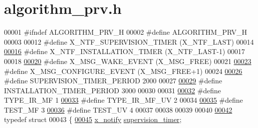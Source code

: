 \hypertarget{a00010_source}{\section{algorithm\+\_\+prv.\+h}
\label{a00010_source}
}

\begin{DoxyCode}
00001 \textcolor{preprocessor}{#ifndef ALGORITHM\_PRV\_H}
00002 \textcolor{preprocessor}{#define ALGORITHM\_PRV\_H}
00003 
00012 \textcolor{preprocessor}{#define X\_NTF\_SUPERVISION\_TIMER                (X\_NTF\_LAST)}
00014 
\hypertarget{a00010_source_l00016}{}\hyperlink{a00010_a3339ece3779a71354bcfaa90905b3a4a}{00016} \textcolor{preprocessor}{#define X\_NTF\_INSTALLATION\_TIMER               (X\_NTF\_LAST-1)}
00017 
00018 
\hypertarget{a00010_source_l00020}{}\hyperlink{a00010_ae6be514b1d949dc71420a3e549772995}{00020} \textcolor{preprocessor}{#define X\_MSG\_WAKE\_EVENT                       (X\_MSG\_FREE)}
00021 
\hypertarget{a00010_source_l00023}{}\hyperlink{a00010_a410c7d83b819fa283303a53830c87a96}{00023} \textcolor{preprocessor}{#define X\_MSG\_CONFIGURE\_EVENT                  (X\_MSG\_FREE+1)}
00024 
\hypertarget{a00010_source_l00026}{}\hyperlink{a00010_abc6f7a40b6aee60b122db32a0d82126c}{00026} \textcolor{preprocessor}{#define SUPERVISION\_TIMER\_PERIOD               2000}
00027 
\hypertarget{a00010_source_l00029}{}\hyperlink{a00010_a8c68dd8d7078113e9f088011171f492c}{00029} \textcolor{preprocessor}{#define INSTALLATION\_TIMER\_PERIOD              3000}
00030 
00031 
\hypertarget{a00010_source_l00032}{}\hyperlink{a00010_a78bbb321092eab3b988cf0c89bf0a572}{00032} \textcolor{preprocessor}{#define  TYPE\_IR\_MF                             1}
\hypertarget{a00010_source_l00033}{}\hyperlink{a00010_a88096870f430e03f71e1f390c67f09ce}{00033} \textcolor{preprocessor}{#define  TYPE\_IR\_MF\_UV                          2}
00034 
\hypertarget{a00010_source_l00035}{}\hyperlink{a00010_a73581885168dab0a1659db63d135b1cc}{00035} \textcolor{preprocessor}{#define  TEST\_MF                                3}
\hypertarget{a00010_source_l00036}{}\hyperlink{a00010_aa48458d081f4a50e025e7d67a92f31f5}{00036} \textcolor{preprocessor}{#define  TEST\_UV                                4}
00037 
00038 
00039 
00040 
\hypertarget{a00010_source_l00042}{}\hyperlink{a00010}{00042} \textcolor{keyword}{typedef} \textcolor{keyword}{struct}
00043 \{
\hypertarget{a00010_source_l00045}{}\hyperlink{a00010_af13eb2dcaed3eca6506489f8ad8fa768}{00045}     \hyperlink{a00030_d7/dcf/a00845}{x\_notify}                         \hyperlink{a00010_af13eb2dcaed3eca6506489f8ad8fa768}{supervision\_timer};

\end{DoxyCode}
